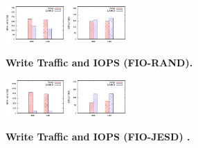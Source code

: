 \begin{figure}[t]
    \centering{}
    \includegraphics[width=0.20\textwidth]{shn-graph/rand-wt.eps}
    \includegraphics[width=0.20\textwidth]{shn-graph/rand-iops.eps}
    \caption{\textbf{Write Traffic and IOPS (FIO-RAND).}}
    \label{fig_dawid_archi}
\end{figure}

\begin{figure}[t]
    \centering{}
    \includegraphics[width=0.20\textwidth]{shn-graph/jesd-wt.eps}
    \includegraphics[width=0.20\textwidth]{shn-graph/jesd-iops.eps}
    \caption{\textbf{Write Traffic and IOPS (FIO-JESD) .}}
    \label{fig_dawid_archi}
\end{figure}

